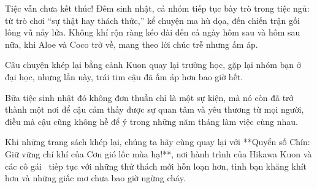 \documentclass[main.tex]{subfiles}
\begin{document}
Tiệc vẫn chưa kết thúc! Đêm sinh nhật, cả nhóm tiếp tục bày trò trong tiệc ngủ: từ trò chơi ``sự thật hay thách thức,'' kể chuyện ma hù dọa, đến chiến trận gối lông vũ nảy lửa. Không khí rộn ràng kéo dài đến cả ngày hôm sau và hôm sau nữa, khi Aloe và Coco trở về, mang theo lời chúc trễ nhưng ấm áp.

Câu chuyện khép lại bằng cảnh Kuon quay lại trường học, gặp lại nhóm bạn ở đại học, nhưng lần này, trái tim cậu đã ấm áp hơn bao giờ hết. 

Bữa tiệc sinh nhật đó không đơn thuần chỉ là một sự kiện, mà nó còn đã trở thành một nơi để cậu cảm thấy được sự quan tâm và yêu thương từ mọi người, điều mà cậu cũng không hề để ý trong những năm tháng làm việc cùng nhau.

Khi những trang sách khép lại, chúng ta hãy cùng quay lại với **Quyển số Chín: Giữ vững chí khí của Cơn gió lốc mùa hạ!**, nơi hành trình của Hikawa Kuon và các cô gái \hll\ tiếp tục với những thử thách mới hỗn loạn hơn, tình bạn khăng khít hơn và những giấc mơ chưa bao giờ ngừng cháy.
\end{document}
